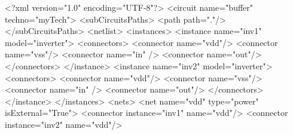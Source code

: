 \begin{DoxyCodeInclude}
<?\textcolor{keyword}{xml} \textcolor{keyword}{version}=\textcolor{stringliteral}{"1.0"} \textcolor{keyword}{encoding}=\textcolor{stringliteral}{"UTF-8"}?>
<\textcolor{keywordtype}{circuit} \textcolor{keyword}{name}=\textcolor{stringliteral}{"buffer"} \textcolor{keyword}{techno}=\textcolor{stringliteral}{"myTech"}>
  <\textcolor{keywordtype}{subCircuitsPaths}>
    <\textcolor{keywordtype}{path}   \textcolor{keyword}{path}=\textcolor{stringliteral}{"."}/>
  </\textcolor{keywordtype}{subCircuitsPaths}>
  <\textcolor{keywordtype}{netlist}>
    <\textcolor{keywordtype}{instances}>
      <\textcolor{keywordtype}{instance} \textcolor{keyword}{name}=\textcolor{stringliteral}{"inv1"} \textcolor{keyword}{model}=\textcolor{stringliteral}{"inverter"}>
        <\textcolor{keywordtype}{connectors}>
          <\textcolor{keywordtype}{connector} \textcolor{keyword}{name}=\textcolor{stringliteral}{"vdd"}/>
          <\textcolor{keywordtype}{connector} \textcolor{keyword}{name}=\textcolor{stringliteral}{"vss"}/>
          <\textcolor{keywordtype}{connector} \textcolor{keyword}{name}=\textcolor{stringliteral}{"in"} />
          <\textcolor{keywordtype}{connector} \textcolor{keyword}{name}=\textcolor{stringliteral}{"out"}/>
        </\textcolor{keywordtype}{connectors}>
      </\textcolor{keywordtype}{instance}>
      <\textcolor{keywordtype}{instance} \textcolor{keyword}{name}=\textcolor{stringliteral}{"inv2"} \textcolor{keyword}{model}=\textcolor{stringliteral}{"inverter"}>
        <\textcolor{keywordtype}{connectors}>
          <\textcolor{keywordtype}{connector} \textcolor{keyword}{name}=\textcolor{stringliteral}{"vdd"}/>
          <\textcolor{keywordtype}{connector} \textcolor{keyword}{name}=\textcolor{stringliteral}{"vss"}/>
          <\textcolor{keywordtype}{connector} \textcolor{keyword}{name}=\textcolor{stringliteral}{"in"} />
          <\textcolor{keywordtype}{connector} \textcolor{keyword}{name}=\textcolor{stringliteral}{"out"}/>
        </\textcolor{keywordtype}{connectors}>
      </\textcolor{keywordtype}{instance}>
    </\textcolor{keywordtype}{instances}>
    <\textcolor{keywordtype}{nets}>
      <\textcolor{keywordtype}{net} \textcolor{keyword}{name}=\textcolor{stringliteral}{"vdd"} \textcolor{keyword}{type}=\textcolor{stringliteral}{"power"} \textcolor{keyword}{isExternal}=\textcolor{stringliteral}{"True"}>
        <\textcolor{keywordtype}{connector} \textcolor{keyword}{instance}=\textcolor{stringliteral}{"inv1"} \textcolor{keyword}{name}=\textcolor{stringliteral}{"vdd"}/>
        <\textcolor{keywordtype}{connector} \textcolor{keyword}{instance}=\textcolor{stringliteral}{"inv2"} \textcolor{keyword}{name}=\textcolor{stringliteral}{"vdd"}/>

\end{DoxyCodeInclude}
